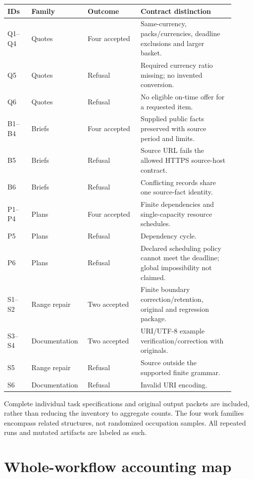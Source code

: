 \begin{longtable}{@{}p{0.10\linewidth}p{0.20\linewidth}p{0.22\linewidth}p{0.39\linewidth}@{}}\toprule
IDs & Family & Outcome & Contract distinction\\\midrule\endhead
Q1--Q4 & Quotes & Four accepted & Same-currency, packs/currencies, deadline exclusions and larger basket.\\
Q5 & Quotes & Refusal & Required currency ratio missing; no invented conversion.\\
Q6 & Quotes & Refusal & No eligible on-time offer for a requested item.\\
B1--B4 & Briefs & Four accepted & Supplied public facts preserved with source period and limits.\\
B5 & Briefs & Refusal & Source URL fails the allowed HTTPS source-host contract.\\
B6 & Briefs & Refusal & Conflicting records share one source-fact identity.\\
P1--P4 & Plans & Four accepted & Finite dependencies and single-capacity resource schedules.\\
P5 & Plans & Refusal & Dependency cycle.\\
P6 & Plans & Refusal & Declared scheduling policy cannot meet the deadline; global impossibility not claimed.\\
S1--S2 & Range repair & Two accepted & Finite boundary correction/retention, original and regression package.\\
S3--S4 & Documentation & Two accepted & URI/UTF-8 example verification/correction with originals.\\
S5 & Range repair & Refusal & Source outside the supported finite grammar.\\
S6 & Documentation & Refusal & Invalid URI encoding.\\\bottomrule
\end{longtable}

Complete individual task specifications and original output packets are included, rather than reducing the inventory to aggregate counts. The four work families encompass related structures, not randomized occupation samples. All repeated runs and mutated artifacts are labeled as such.

\FloatBarrier
\section{Whole-workflow accounting map}

